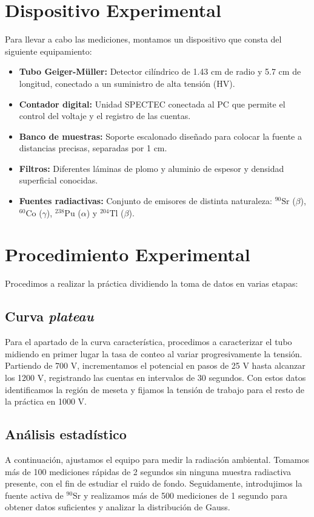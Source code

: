 \documentclass[9pt,a4paper,twocolumn,twoside]{rho-class/rho}
\begin{document}
\section{Dispositivo Experimental}

Para llevar a cabo las mediciones, montamos un dispositivo que consta del siguiente equipamiento:

\begin{itemize}
    \item \textbf{Tubo Geiger-Müller:} Detector cilíndrico de 1.43 cm de radio y 5.7 cm de longitud, conectado a un suministro de alta tensión (HV).
    \item \textbf{Contador digital:} Unidad SPECTEC conectada al PC que permite el control del voltaje y el registro de las cuentas.
    \item \textbf{Banco de muestras:} Soporte escalonado diseñado para colocar la fuente a distancias precisas, separadas por 1 cm.
    \item \textbf{Filtros:} Diferentes láminas de plomo y aluminio de espesor y densidad superficial conocidas.
    \item \textbf{Fuentes radiactivas:} Conjunto de emisores de distinta naturaleza: $^{90}\text{Sr}$ ($\beta$), $^{60}\text{Co}$ ($\gamma$), $^{238}\text{Pu}$ ($\alpha$) y $^{204}\text{Tl}$ ($\beta$).
\end{itemize}

\section{Procedimiento Experimental}

Procedimos a realizar la práctica dividiendo la toma de datos en varias etapas:

\subsection{Curva \textit{plateau}}
Para el apartado de la curva característica, procedimos a caracterizar el tubo midiendo en primer lugar la tasa de conteo al variar progresivamente la tensión. Partiendo de 700 V, incrementamos el potencial en pasos de 25 V hasta alcanzar los 1200 V, registrando las cuentas en intervalos de 30 segundos. Con estos datos identificamos la región de meseta y fijamos la tensión de trabajo para el resto de la práctica en 1000 V.

\subsection{Análisis estadístico}
A continuación, ajustamos el equipo para medir la radiación ambiental. Tomamos más de 100 mediciones rápidas de 2 segundos sin ninguna muestra radiactiva presente, con el fin de estudiar el ruido de fondo. Seguidamente, introdujimos la fuente activa de $^{90}\text{Sr}$ y realizamos más de 500 mediciones de 1 segundo para obtener datos suficientes y analizar la distribución de Gauss.
\end{document}
